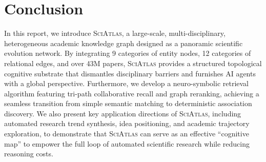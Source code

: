 \documentclass{llmxive}
\providecommand{\ours}{\textsc{SciAtlas}}
\begin{document}
\section{Conclusion}
In this report, we introduce {\ours}, a large-scale, multi-disciplinary, heterogeneous academic knowledge graph designed as a panoramic scientific evolution network. By integrating 9 categories of entity nodes, 12 categories of relational edges, and over 43M papers, {\ours} provides a structured topological cognitive substrate that dismantles disciplinary barriers and furnishes AI agents with a global perspective. Furthermore, we develop a neuro-symbolic retrieval algorithm featuring tri-path collaborative recall and graph reranking, achieving a seamless transition from simple semantic matching to deterministic association discovery. We also present key application directions of {\ours}, including automated research trend synthesis, idea positioning, and academic trajectory exploration, to demonstrate that {\ours} can serve as an effective ``cognitive map'' to empower the full loop of automated scientific research while reducing reasoning costs.


% 









\appendix
\end{document}
